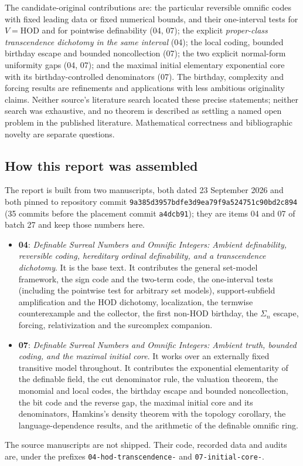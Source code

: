 \documentclass[11pt,a4paper]{article}
\numberwithin{equation}{section}
\theoremstyle{definition}
\theoremstyle{remark}
\newcommand{\HOD}{\mathrm{HOD}}
\newcommand{\repoSHA}{\texttt{9a385d3957bdfe3d9ea79f9a524751c90bd2c894}}
\newcommand{\fn}[1]{\nolinkurl{#1}}
\begin{document}
The candidate-original contributions are: the particular reversible
omnific codes with fixed leading data or fixed numerical bounds, and their
one-interval tests for $V=\HOD$ and for pointwise definability (04, 07);
the explicit \emph{proper-class transcendence dichotomy in the same
interval} (04); the local coding, bounded birthday escape and bounded
noncollection (07); the two explicit normal-form uniformity gaps (04,
07); and the maximal initial elementary exponential core with its
birthday-controlled denominators (07). The birthday, complexity and
forcing results are refinements and applications with less ambitious
originality claims. Neither source's literature search located these
precise statements; neither search was exhaustive, and no theorem is
described as settling a named open problem in the published literature.
Mathematical correctness and bibliographic novelty are separate questions.

\subsection{How this report was assembled}\label{dsn:sub:provenance}

The report is built from two manuscripts, both dated 23 September 2026 and
both pinned to repository commit \repoSHA{} (35 commits before the
placement commit \texttt{a4dcb91}); they are items 04 and 07 of batch 27
and keep those numbers here.
\begin{itemize}
\item \textbf{04}: \emph{Definable Surreal Numbers and Omnific Integers:
Ambient definability, reversible coding, hereditary ordinal definability,
and a transcendence dichotomy}. It is the base text. It contributes the
general set-model framework, the sign code and the two-term code, the
one-interval tests (including the pointwise test for arbitrary set
models), support-subfield amplification and the $\HOD$ dichotomy,
localization, the termwise counterexample and the collector, the first
non-$\HOD$ birthday, the $\Sigma_n$ escape, forcing, relativization and
the surcomplex companion.
\item \textbf{07}: \emph{Definable Surreal Numbers and Omnific Integers:
Ambient truth, bounded coding, and the maximal initial core}. It works over
an externally fixed transitive model throughout. It contributes the
exponential elementarity of the definable field, the cut denominator rule,
the valuation theorem, the monomial and local codes, the birthday escape
and bounded noncollection, the bit code and the reverse gap, the maximal
initial core and its denominators, Hamkins's density theorem with the
topology corollary, the language-dependence results, and the arithmetic of
the definable omnific ring.
\end{itemize}
The source manuscripts are not shipped. Their code, recorded data and
audits are, under the prefixes \fn{04-hod-transcendence-} and
\fn{07-initial-core-}.
\end{document}
